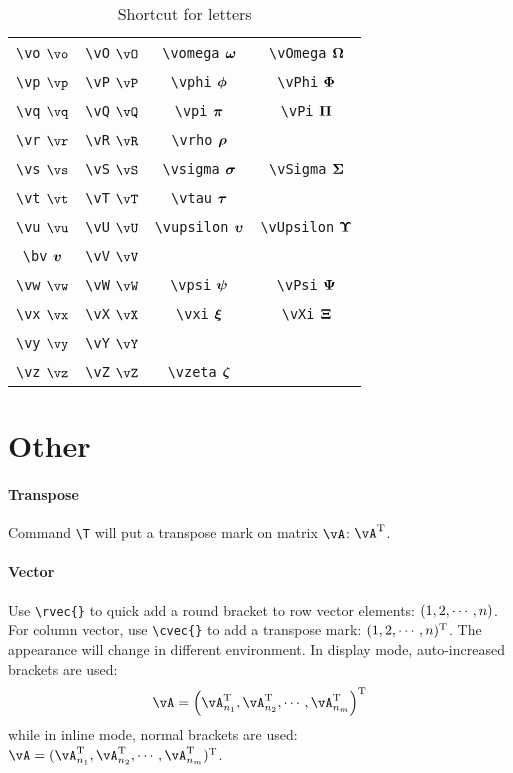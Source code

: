 \documentclass{article}
\begin{document}
\begin{table}[h]
\begin{tabular}{cccc}
    \verb"\vo" \quad $\vo$ & \verb"\vO" \quad $\vO$ & \verb"\vomega" \quad $\bm\omega$ & \verb"\vOmega" \quad $\bm\Omega$ \\
    \verb"\vp" \quad $\vp$ & \verb"\vP" \quad $\vP$ & \verb"\vphi" \quad $\bm\phi$ & \verb"\vPhi" \quad $\bm\Phi$ \\
    \verb"\vq" \quad $\vq$ & \verb"\vQ" \quad $\vQ$ & \verb"\vpi" \quad $\bm\pi$ & \verb"\vPi" \quad $\bm\Pi$ \\
    \verb"\vr" \quad $\vr$ & \verb"\vR" \quad $\vR$ & \verb"\vrho" \quad $\bm\rho$ & \\
    \verb"\vs" \quad $\vs$ & \verb"\vS" \quad $\vS$ & \verb"\vsigma" \quad $\bm\sigma$ & \verb"\vSigma" \quad $\bm\Sigma$ \\
    \verb"\vt" \quad $\vt$ & \verb"\vT" \quad $\vT$ & \verb"\vtau" \quad $\bm\tau$ & \\
    \verb"\vu" \quad $\vu$ & \verb"\vU" \quad $\vU$ & \verb"\vupsilon" \quad $\bm\upsilon$ & \verb"\vUpsilon" \quad $\bm\Upsilon$ \\
    \verb"\bv" \quad $\bm{v}$ & \verb"\vV" \quad $\vV$ & & \\
    \verb"\vw" \quad $\vw$ & \verb"\vW" \quad $\vW$ & \verb"\vpsi" \quad $\bm\psi$ & \verb"\vPsi" \quad $\bm\Psi$ \\
    \verb"\vx" \quad $\vx$ & \verb"\vX" \quad $\vX$ & \verb"\vxi" \quad $\bm\xi$ & \verb"\vXi" \quad $\bm\Xi$ \\
    \verb"\vy" \quad $\vy$ & \verb"\vY" \quad $\vY$ & & \\
    \verb"\vz" \quad $\vz$ & \verb"\vZ" \quad $\vZ$ & \verb"\vzeta" \quad $\bm\zeta$ & \\
    \bottomrule
    \end{tabular}
    \caption{Shortcut for letters}
    \label{tab:schortcut-letters}
\end{table}

\section{Other}

\paragraph{Transpose} Command \verb"\T" will put a transpose mark on matrix $\vA$: $\vA\T$.

\paragraph{Vector} Use \verb"\rvec{}" to quick add a round bracket to row vector elements: $\rvec{1,2,\cdots,n}$. For column vector, use \verb"\cvec{}" to add a transpose mark: $\cvec{1,2,\cdots,n}$. 
The appearance will change in different environment. In display mode, auto-increased brackets are used:
$$
\vA = \cvec{\vA_{n_1}\T,\vA_{n_2}\T,\cdots,\vA_{n_m}\T}
$$
while in inline mode, normal brackets are used: $\vA = \cvec{\vA_{n_1}\T,\vA_{n_2}\T,\cdots,\vA_{n_m}\T}$.
\end{document}
